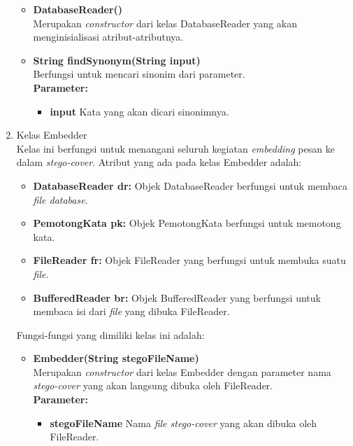 \begin{enumerate}
	\begin{itemize}
		\item \textbf{DatabaseReader()}\\
		Merupakan \textit{constructor} dari kelas DatabaseReader yang akan menginisialisasi atribut-atributnya.
		\item \textbf{String findSynonym(String input)}\\
		Berfungsi untuk mencari sinonim dari parameter.\\
		\textbf{Parameter:}
		\begin{itemize}
			\item \textbf{input} Kata yang akan dicari sinonimnya.
		\end{itemize}
	\end{itemize}
	
	\item Kelas Embedder\\
	Kelas ini berfungsi untuk menangani seluruh kegiatan \textit{embedding} pesan ke dalam \textit{stego-cover}. Atribut yang ada pada kelas Embedder adalah:
	\begin{itemize}
		\item \textbf{DatabaseReader dr:} Objek DatabaseReader berfungsi untuk membaca \textit{file database}.
		\item \textbf{PemotongKata pk:} Objek PemotongKata berfungsi untuk memotong kata.
		\item \textbf{FileReader fr:} Objek FileReader yang berfungsi untuk membuka suatu \textit{file}.
		\item \textbf{BufferedReader br:} Objek BufferedReader yang berfungsi untuk membaca isi dari \textit{file} yang dibuka FileReader.
	\end{itemize}
	
	Fungsi-fungsi yang dimiliki kelas ini adalah:
	
	\begin{itemize}
		\item \textbf{Embedder(String stegoFileName)}\\
		Merupakan \textit{constructor} dari kelas Embedder dengan parameter nama \textit{stego-cover} yang akan langsung dibuka oleh FileReader.\\
		\textbf{Parameter:}
		\begin{itemize}
			\item \textbf{stegoFileName} Nama \textit{file stego-cover} yang akan dibuka oleh FileReader.
		\end{itemize}
		

\end{itemize}
\end{enumerate}
